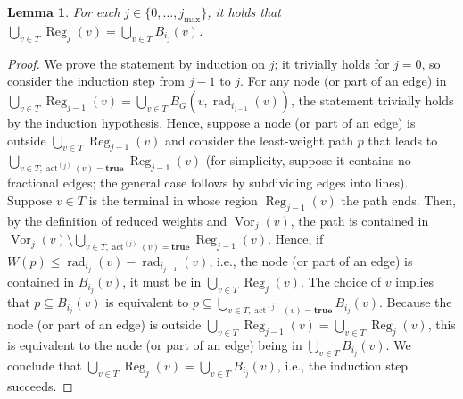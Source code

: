 \documentclass[letterpaper,11pt]{article}
\newtheorem{lemma}[theorem]{Lemma}
\DeclareMathOperator{\act}{act}
\DeclareMathOperator{\moat}{rad}
\DeclareMathOperator{\reg}{Reg}
\DeclareMathOperator{\vor}{Vor}
\newcommand{\true}{\mathbf{true}}
\begin{document}
\begin{lemma}\label{lemma:decomp}
For each $j\in \{0,\ldots,j_{\max}\}$, it holds that $\bigcup_{v\in
T}\reg_j(v)=\bigcup_{v\in T}B_{i_j}(v)$.
\end{lemma}
\begin{proof}
We prove the statement by induction on $j$; it trivially holds for $j=0$, so
consider the induction step from $j-1$ to $j$. For any node (or part of an edge)
in $\bigcup_{v\in T}\reg_{j-1}(v)=\bigcup_{v\in T}B_G(v,\moat_{i_{j-1}}(v))$,
the statement trivially holds by the induction hypothesis. Hence, suppose a node
(or part of an edge) is outside $\bigcup_{v\in T}\reg_{j-1}(v)$ and
consider the least-weight path $p$ that leads to $\bigcup_{v\in T,
\act^{(j)}(v)=\true}\reg_{j-1}(v)$ (for simplicity, suppose it contains no
fractional edges; the general case follows by subdividing edges into lines).
Suppose $v\in T$ is the terminal in whose region $\reg_{j-1}(v)$ the path ends.
Then, by the definition of reduced weights and $\vor_j(v)$, the path is
contained in $\vor_j(v)\setminus \bigcup_{v\in T,\act^{(j)}(v)=\true}\reg_{j-1}(v)$.
Hence, if $W(p)\leq \moat_{i_j}(v)-\moat_{i_{j-1}}(v)$, i.e., the node (or part
of an edge) is contained in $B_{i_j}(v)$, it must be in $\bigcup_{v\in
T}\reg_j(v)$. The choice of $v$ implies that $p\subseteq B_{i_j}(v)$ is
equivalent to $p\subseteq \bigcup_{v\in T,\act^{(j)}(v)=\true}B_{i_j}(v)$. Because
the node (or part of an edge) is outside $\bigcup_{v\in
T}\reg_{j-1}(v)=\bigcup_{v\in T}\reg_j(v)$, this is equivalent to the node (or
part of an edge) being in $\bigcup_{v\in T}B_{i_j}(v)$. We
conclude that $\bigcup_{v\in T}\reg_j(v)=\bigcup_{v\in T}B_{i_j}(v)$, i.e., the
induction step succeeds.
\end{proof}
\end{document}
